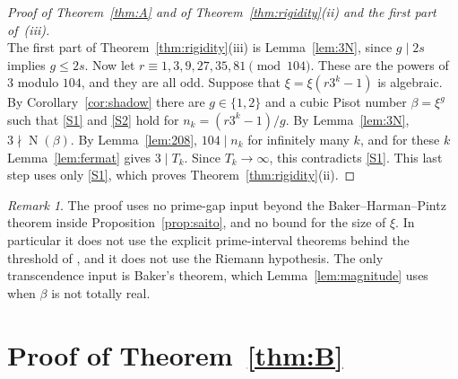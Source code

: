 \documentclass[11pt,a4paper]{article}
\theoremstyle{definition}
\theoremstyle{remark}
\newtheorem{remark}[theorem]{Remark}
\DeclareMathOperator{\Nm}{N}
\begin{document}
\begin{proof}[Proof of Theorem~\ref{thm:A} and of Theorem~\ref{thm:rigidity}\textup{(ii)} and the first part of~\textup{(iii)}]\leavevmode\\
The first part of Theorem~\ref{thm:rigidity}(iii) is Lemma~\ref{lem:3N}, since $g\mid 2s$ implies $g\le2s$.
Now let $r\equiv1,3,9,27,35,81\pmod{104}$. These are the powers of $3$ modulo $104$, and they are all odd.
Suppose that $\xi=\xi(r3^k-1)$ is algebraic.
By Corollary~\ref{cor:shadow} there are $g\in\{1,2\}$ and a cubic Pisot number $\beta=\xi^g$ such that \ref{S1} and \ref{S2} hold for $n_k=(r3^k-1)/g$.
By Lemma~\ref{lem:3N}, $3\nmid\Nm(\beta)$.
By Lemma~\ref{lem:208}, $104\mid n_k$ for infinitely many $k$, and for these $k$ Lemma~\ref{lem:fermat} gives $3\mid T_k$.
Since $T_k\to\infty$, this contradicts \ref{S1}.
This last step uses only \ref{S1}, which proves Theorem~\ref{thm:rigidity}(ii).
\end{proof}

\begin{remark}
The proof uses no prime-gap input beyond the Baker--Harman--Pintz theorem inside Proposition~\ref{prop:saito}, and no bound for the size of $\xi$.
In particular it does not use the explicit prime-interval theorems behind the threshold of \cite[Corollary~2.7]{SaiVar}, and it does not use the Riemann hypothesis.
The only transcendence input is Baker's theorem, which Lemma~\ref{lem:magnitude} uses when $\beta$ is not totally real.
\end{remark}

\section{Proof of Theorem~\ref{thm:B}}\label{sec:B}
\end{document}
